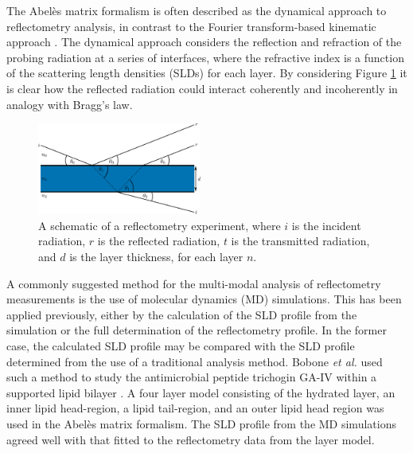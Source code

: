 \documentclass[amsmath,amssymb,twocolumn,superscriptaddress,aps,prl]{revtex4-1}
\begin{document}
The Abel\`{e}s matrix formalism is often described as the dynamical approach to reflectometry analysis, in contrast to the Fourier transform-based kinematic approach \cite{Crowley1991,Lu1996}.
The dynamical approach considers the reflection and refraction of the probing radiation at a series of interfaces, where the refractive index is a function of the scattering length densities (SLDs) for each layer.
By considering Figure \ref{fig:dyn} it is clear how the reflected radiation could interact coherently and incoherently in analogy with Bragg's law.
%
\begin{figure}[h]
\centering
  \includegraphics[width=0.48\textwidth]{figures/reflrefr}
  \caption{A schematic of a reflectometry experiment, where $i$ is the incident radiation, $r$ is the reflected radiation, $t$ is the transmitted radiation, and $d$ is the layer thickness, for each layer $n$.}
  \label{fig:dyn}
\end{figure}
%

A commonly suggested method for the multi-modal analysis of reflectometry measurements is the use of molecular dynamics (MD) simulations.
This has been applied previously, either by the calculation of the SLD profile from the simulation or the full determination of the reflectometry profile.
In the former case, the calculated SLD profile may be compared with the SLD profile determined from the use of a traditional analysis method.
Bobone \emph{et al.} used such a method to study the antimicrobial peptide trichogin GA-IV within a supported lipid bilayer \cite{Bobone2013}.
A four layer model consisting of the hydrated  layer, an inner lipid head-region, a lipid tail-region, and an outer lipid head region was used in the Abel\`{e}s matrix formalism.
The SLD profile from the MD simulations agreed well with that fitted to the reflectometry data from the layer model.
\end{document}
